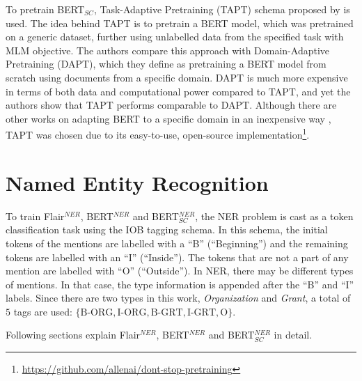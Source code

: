\documentclass{report}
\theoremstyle{definition}
\theoremstyle{remark}
\begin{document}
To pretrain BERT$_{SC}$, Task-Adaptive Pretraining (TAPT) schema proposed by \cite{DontStop} is used. The idea behind TAPT is to pretrain a BERT model, which was pretrained on a generic dataset, further using unlabelled data from the specified task with MLM objective. The authors compare this approach with Domain-Adaptive Pretraining (DAPT), which they define as pretraining a BERT model from scratch using documents from a specific domain. DAPT is much more expensive in terms of both data and computational power compared to TAPT, and yet the authors show that TAPT performs comparable to DAPT. Although there are other works on adapting BERT to a specific domain in an inexpensive way \textcolor{red}{\cite{}}, TAPT was chosen due to its easy-to-use, open-source implementation\footnote{\url{https://github.com/allenai/dont-stop-pretraining}}.


\section{Named Entity Recognition}
\label{sec:NERMEThod}

To train  Flair$^{NER}$, BERT$^{NER}$ and BERT$^{NER}_{SC}$, the NER problem is cast as a token classification task using the IOB tagging schema. In this schema, the initial tokens of the mentions are labelled with a ``B'' (``Beginning'') and the remaining tokens are labelled with an ``I'' (``Inside''). The tokens that are not a part of any mention are labelled with ``O'' (``Outside''). In NER, there may be different types of mentions. In that case, the type information is appended after the ``B'' and ``I'' labels. Since there are two types in this work, \textit{Organization} and \textit{Grant}, a total of $5$ tags are used: $\{ \text{B-ORG}, \text{I-ORG}, \text{B-GRT}, \text{I-GRT}, \text{O} \}$.

Following sections explain Flair$^{NER}$, BERT$^{NER}$ and BERT$^{NER}_{SC}$ in detail.
\end{document}
